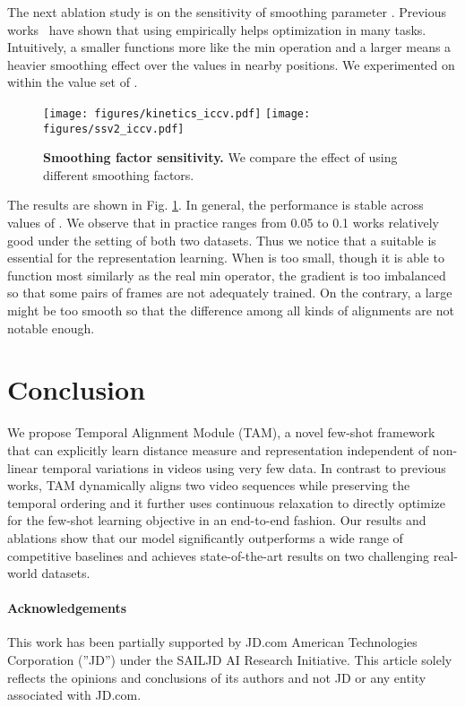 \documentclass[10pt,twocolumn,letterpaper]{article}
\begin{document}
The next ablation study is on the sensitivity of smoothing parameter . Previous works~\cite{chang2019d, mensch2018differentiable} have shown that using  empirically helps optimization in many tasks. Intuitively, a smaller  functions more like the min operation and a larger  means a heavier smoothing effect over the values in nearby positions. We experimented on  within the value set of . 

\begin{figure}[t]
\centering
\texttt{[image: figures/kinetics\_iccv.pdf]}
\texttt{[image: figures/ssv2\_iccv.pdf]}
\vspace{-2mm}
\caption{\textbf{Smoothing factor sensitivity.} We compare the effect of using different smoothing factors.}
\vspace{-5mm}
\label{fig:lambda}
\end{figure}


The results are shown in Fig. \ref{fig:lambda}. In general, the performance is stable across values of . We observe that in practice  ranges from 0.05 to 0.1 works relatively good under the setting of both two datasets. Thus we notice that a suitable  is essential for the representation learning. When  is too small, though it is able to function most similarly as the real min operator, the gradient is too imbalanced so that some pairs of frames are not adequately trained. On the contrary, a large  might be too smooth so that the difference among all kinds of alignments are not notable enough.

\section{Conclusion}
We propose Temporal Alignment Module (TAM), a novel few-shot framework that can explicitly learn distance measure and representation independent of non-linear temporal variations in videos using very few data. In contrast to previous works, TAM dynamically aligns two video sequences while preserving the temporal ordering and it further uses continuous relaxation to directly optimize for the few-shot learning objective in an end-to-end fashion. Our results and ablations show that our model significantly outperforms a wide range of competitive baselines and achieves state-of-the-art results on two challenging real-world datasets. 

\paragraph{Acknowledgements} This work has been partially supported by JD.com American Technologies Corporation (”JD”) under the SAILJD AI Research Initiative. This article solely reflects the opinions and conclusions of its authors and not JD or any entity associated with JD.com.








{\small


}
\end{document}
